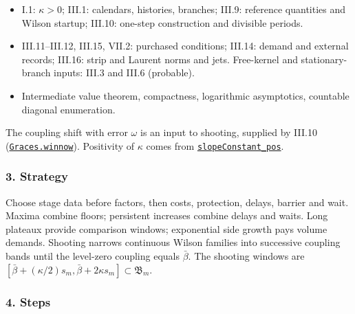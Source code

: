 \documentclass[
  letterpaper,
  11pt]{article}
\providecommand{\tightlist}{%
  \setlength{\itemsep}{0pt}\setlength{\parskip}{0pt}}
\begin{document}
\begin{itemize}
\tightlist
\item
  I.1: \(\kappa>0\); III.1: calendars, histories, branches; III.9:
  reference quantities and Wilson startup; III.10: one-step construction
  and divisible periods.
\item
  III.11--III.12, III.15, VII.2: purchased conditions; III.14: demand
  and external records; III.16: strip and Laurent norms and jets.
  Free-kernel and stationary-branch inputs: III.3 and III.6 (probable).
\item
  Intermediate value theorem, compactness, logarithmic asymptotics,
  countable diagonal enumeration.
\end{itemize}

The coupling shift with error \(\omega\) is an input to shooting,
supplied by III.10
(\href{https://github.com/yang-mills-group/OpenAI-YM-20261028/blob/3456e5e75cf8d4cd558955a5c7638fba2d68f464/YM/PhysicalNext/RG_NEXT_COMPLETE_REPEATABLE_NONLINEAR_STEP/Graces/Eagles.lean\#L33-L50}{\texttt{Graces.winnow}}).
Positivity of \(\kappa\) comes from
\href{https://github.com/yang-mills-group/OpenAI-YM-20261028/blob/3456e5e75cf8d4cd558955a5c7638fba2d68f464/YM/Gauge/Casimir.lean\#L174-L176}{\texttt{slopeConstant\_pos}}.

\subsubsection{3. Strategy}\label{strategy-4}

Choose stage data before factors, then costs, protection, delays,
barrier and wait. Maxima combine floors; persistent increases combine
delays and waits. Long plateaux provide comparison windows; exponential
side growth pays volume demands. Shooting narrows continuous Wilson
families into successive coupling bands until the level-zero coupling
equals \(\bar\beta\). The shooting windows are
\([\bar\beta+(\kappa/2)s_m,\bar\beta+2\kappa s_m]\subset\mathfrak B_m\).

\subsubsection{4. Steps}\label{steps-4}
\end{document}
